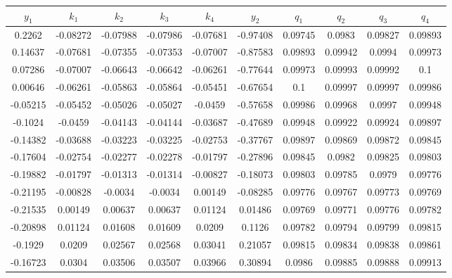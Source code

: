 \renewcommand{\arraystretch}{1.284}
\begin{center}
\begin{table}[htbp]
	\footnotesize
		\begin{tabular}{|c|c|c|c|c|c|c|c|c|c|}
			\hline
			$ y_{1} $ & $ k_{1} $ & $ k_{2} $ & $ k_{3} $ & $ k_{4} $ & $ y_{2} $ & $ q_{1} $ & $ q_{2} $ & $ q_{3} $ & $ q_{4} $ \\
			\hline
			0.2262 & -0.08272 & -0.07988 & -0.07986 & -0.07681 & -0.97408 & 0.09745 & 0.0983 & 0.09827 & 0.09893 \\
			\hline
			0.14637 & -0.07681 & -0.07355 & -0.07353 & -0.07007 & -0.87583 & 0.09893 & 0.09942 & 0.0994 & 0.09973 \\
			\hline
			0.07286 & -0.07007 & -0.06643 & -0.06642 & -0.06261 & -0.77644 & 0.09973 & 0.09993 & 0.09992 & 0.1 \\
			\hline
			0.00646 & -0.06261 & -0.05863 & -0.05864 & -0.05451 & -0.67654 & 0.1 & 0.09997 & 0.09997 & 0.09986 \\
			\hline
			-0.05215 & -0.05452 & -0.05026 & -0.05027 & -0.0459 & -0.57658 & 0.09986 & 0.09968 & 0.0997 & 0.09948 \\
			\hline
			-0.1024 & -0.0459 & -0.04143 & -0.04144 & -0.03687 & -0.47689 & 0.09948 & 0.09922 & 0.09924 & 0.09897 \\
			\hline
			-0.14382 & -0.03688 & -0.03223 & -0.03225 & -0.02753 & -0.37767 & 0.09897 & 0.09869 & 0.09872 & 0.09845 \\
			\hline
			-0.17604 & -0.02754 & -0.02277 & -0.02278 & -0.01797 & -0.27896 & 0.09845 & 0.0982 & 0.09825 & 0.09803 \\
			\hline
			-0.19882 & -0.01797 & -0.01313 & -0.01314 & -0.00827 & -0.18073 & 0.09803 & 0.09785 & 0.0979 & 0.09776 \\
			\hline
			-0.21195 & -0.00828 & -0.0034 & -0.0034 & 0.00149 & -0.08285 & 0.09776 & 0.09767 & 0.09773 & 0.09769 \\
			\hline
			-0.21535 & 0.00149 & 0.00637 & 0.00637 & 0.01124 & 0.01486 & 0.09769 & 0.09771 & 0.09776 & 0.09782 \\
			\hline
			-0.20898 & 0.01124 & 0.01608 & 0.01609 & 0.0209 & 0.1126 & 0.09782 & 0.09794 & 0.09799 & 0.09815 \\
			\hline
			-0.1929 & 0.0209 & 0.02567 & 0.02568 & 0.03041 & 0.21057 & 0.09815 & 0.09834 & 0.09838 & 0.09861 \\
			\hline
			-0.16723 & 0.0304 & 0.03506 & 0.03507 & 0.03966 & 0.30894 & 0.0986 & 0.09885 & 0.09888 & 0.09913 \\

\end{tabular}
\end{table}
\end{center}
